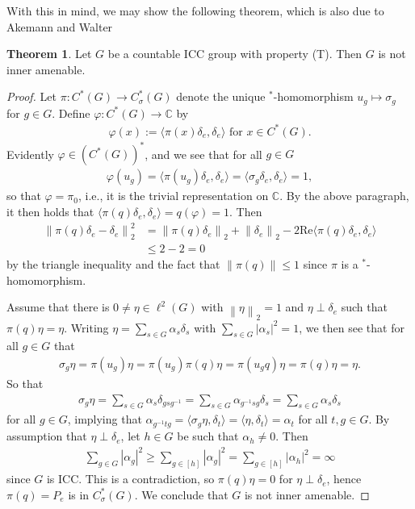 \documentclass[10pt,oneside,openany,final]{memoir}
\theoremstyle{definition}
\newtheorem{theorem}{Theorem}
\theoremstyle{Break}
\newcommand{\lv}{\left\lVert}
\newcommand{\rv}{\right\rVert}
\newcommand{\C}{\mathbb{C}}
\begin{document}
With this in mind, we may show the following theorem, which is also due to Akemann and Walter
\begin{theorem}
Let $G$ be a countable ICC group with property (T). Then $G$ is not inner amenable.	
\end{theorem}
\begin{proof}
	Let $\pi \colon C^*(G) \to C_\sigma^*(G)$ denote the unique $^*$-homomorphism $u_g \mapsto \sigma_g$ for $g \in G$. Define $\varphi \colon C^*(G) \to \C$ by 
	\begin{align*}
		\varphi(x):=\langle \pi(x) \delta_e, \delta_e\rangle \text{ for } x \in C^*(G).
	\end{align*}
	Evidently $\varphi \in (C^*(G))^*$, and we see that for all $g \in G$
	\begin{align*}
		\varphi(u_g)=\langle \pi(u_g) \delta_e, \delta_e\rangle = \langle \sigma_g \delta_e, \delta_e \rangle = 1,
	\end{align*}
	so that $\varphi=\pi_0$, i.e., it is the trivial representation on $\C$. By the above paragraph, it then holds that $\langle \pi(q) \delta_e , \delta_e \rangle =q(\varphi)=1$. Then
	\begin{align*}
		\lv \pi(q)\delta_e - \delta_e\rv_2^2 &=\lv \pi(q) \delta_e\rv_2 + \lv \delta_e \rv_2 - 2\mathrm{Re}\langle \pi(q) \delta_e,\delta_e\rangle\\
		&\leq 2-2=0
	\end{align*}
	by the triangle inequality and the fact that $\lv\pi(q)\rv \leq 1$ since $\pi$ is a $^*$-homomorphism. 
	
	Assume that there is $0 \neq \eta \in \ell^2(G)$ with $\lv \eta \rv_2 = 1$ and $\eta \perp \delta_e$ such that $\pi(q)\eta = \eta$. Writing $\eta=\sum_{s \in G}\alpha_s \delta_s$ with $\sum_{s \in G}|\alpha_s|^2 =1$, we then see that for all $g \in G$ that
	\begin{align*}
		\sigma_g \eta = \pi(u_g) \eta = \pi(u_g)\pi(q) \eta = \pi(u_gq) \eta = \pi(q) \eta = \eta.
	\end{align*} 
	So that 
\begin{align*}
	\sigma_g \eta=  \sum_{s \in G}\alpha_s \delta_{gsg^{-1}}=\sum_{s \in G}\alpha_{g^{-1}sg}\delta_s=\sum_{s \in G}\alpha_s \delta_s
\end{align*}
for all $g \in G$, implying that $\alpha_{g^{-1}tg}= \langle \sigma_{g} \eta , \delta_t \rangle = \langle\eta,\delta_t \rangle = \alpha_t$ for all $t,g \in G$. By assumption that $\eta \perp \delta_e$, let $h \in G$ be such that $\alpha_h\neq 0$. Then 
\begin{align*}
	\sum_{g \in G} |\alpha_g|^2 \geq \sum_{g \in [h]}|\alpha_{g}|^2=\sum_{g \in [h]}|\alpha_h|^2 = \infty
\end{align*}
since $G$ is ICC. This is a contradiction, so $\pi(q)\eta=0$ for $\eta \perp \delta_e$, hence $\pi(q)=P_e$ is in $C_\sigma^*(G)$. We conclude that $G$ is not inner amenable.
\end{proof}
\end{document}
